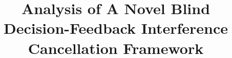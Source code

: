 \documentclass[conference]{IEEEtran}
\begin{document}
%
\title{Analysis of A Novel Blind Decision-Feedback Interference Cancellation Framework}


\author{
\IEEEauthorblockA{LG Electronics Mobile Research\\
San Diego, CA 92131-1639
} }



%

\end{document}
